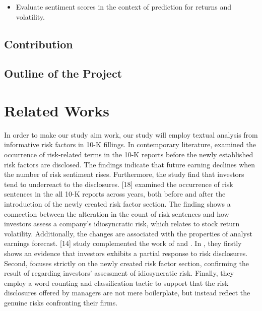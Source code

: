 \documentclass[logo,bsc,singlespacing,parskip]{infthesis}
\begin{document}
\begin{itemize}
    \item Evaluate sentiment scores in the context of prediction for returns and volatility.
\end{itemize}


\section{Contribution}
\section{Outline of the Project}





\chapter{Related Works}
In order to make our study aim work, our study will employ textual analysis from informative risk factors in 10-K fillings. In contemporary literature, \citep{wang2016financial} examined the occurrence of risk-related terms in the 10-K reports before the newly established risk factors are disclosed. The findings indicate that future earning declines when the number of risk sentiment rises. Furthermore, the study find that investors tend to underreact to the disclosures. [18] examined the occurrence of risk sentences in the all 10-K reports across years, both before and after the introduction of the newly created risk factor section. The finding shows a connection between the alteration in the count of risk sentences and how investors assess a company’s idiosyncratic risk, which relates to stock return volatility. Additionally, the changes are associated with the properties of analyst earnings forecast. [14] study complemented the work of \citep{wang2016financial} and \citep{kravetmuslu2013}. In \citep{campbelletal2014a}, they firstly shows an evidence that investors exhibits a partial response to risk disclosures. Second, \citep{campbelletal2014a} focuses strictly on the newly created risk factor section, confirming the result of \citep{kravetmuslu2013} regarding investors’ assessment of idiosyncratic risk. Finally, they employ a word counting and classification tactic to support that the risk disclosures offered by managers are not mere boilerplate, but instead reflect the genuine risks confronting their firms. 
\end{document}
